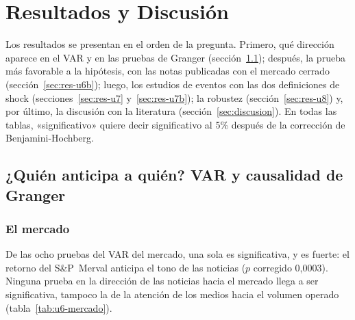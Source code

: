 \chapter{Resultados y Discusión}
\label{cap:resultados}

Los resultados se presentan en el orden de la pregunta. Primero, qué dirección aparece en el
VAR y en las pruebas de Granger (sección~\ref{sec:res-u6}); después, la prueba más favorable a
la hipótesis, con las notas publicadas con el mercado cerrado (sección~\ref{sec:res-u6b});
luego, los estudios de eventos con las dos definiciones de shock
(secciones~\ref{sec:res-u7} y~\ref{sec:res-u7b}); la robustez (sección~\ref{sec:res-u8}) y,
por último, la discusión con la literatura (sección~\ref{sec:discusion}). En todas las tablas,
«significativo» quiere decir significativo al 5\% después de la corrección de
Benjamini-Hochberg.

\section{¿Quién anticipa a quién? VAR y causalidad de Granger}
\label{sec:res-u6}

\subsection{El mercado}

De las ocho pruebas del VAR del mercado, una sola es significativa, y es fuerte: el retorno
del S\&P~Merval anticipa el tono de las noticias ($p$ corregido 0,0003). Ninguna prueba en la
dirección de las noticias hacia el mercado llega a ser significativa, tampoco la de la atención
de los medios hacia el volumen operado (tabla~\ref{tab:u6-mercado}).

